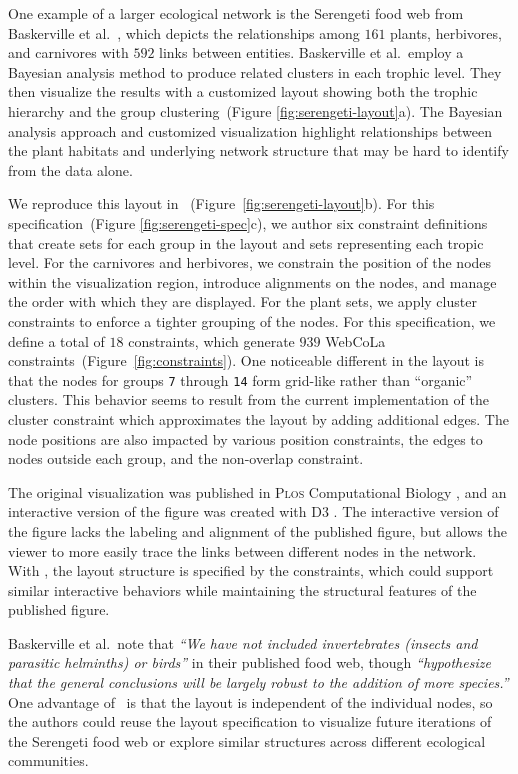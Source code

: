 One example of a larger ecological network is the Serengeti food web from
Baskerville et al.~\cite{baskerville2011spatial}, which depicts the
relationships among $161$ plants, herbivores, and carnivores with $592$ links
between entities. Baskerville et al.\ employ a Bayesian analysis method to
produce related clusters in each trophic level. They then visualize the results with a
customized layout showing both the trophic hierarchy and
the group clustering~(Figure \ref{fig:serengeti-layout}a). The Bayesian
analysis approach and customized visualization highlight relationships between
the plant habitats and underlying network structure that may be hard to identify
from the data alone.

We reproduce this layout in \projectname~(Figure~\ref{fig:serengeti-layout}b).
For this specification~(Figure \ref{fig:serengeti-spec}c), we author six constraint 
definitions that create sets for each group in the layout and sets 
representing each tropic level. For the carnivores and herbivores,
we constrain the position of the nodes within the visualization region,
introduce alignments on the nodes, and manage the order with which they
are displayed. For the plant sets, we apply cluster constraints
to enforce a tighter grouping of the nodes. For this specification,
we define a total of $18$ \projectname constraints, which generate $939$
WebCoLa constraints~(Figure~\ref{fig:constraints}). One noticeable different
in the \projectname layout is that the nodes for groups \texttt{7} through
\texttt{14} form grid-like rather than ``organic'' clusters. This behavior
seems to result from the current implementation of the cluster constraint
which approximates the layout by adding additional edges. The node
positions are also impacted by various position constraints, the edges to 
nodes outside each group, and the non-overlap constraint.

The original visualization was published in \textsc{Plos} Computational
Biology \cite{baskerville2011spatial}, and an interactive version of the
figure was created with D3 \cite{baskerville2011interactive}. The
interactive version of the figure lacks the labeling and alignment of the
published figure, but allows the viewer to more easily trace the links
between different nodes in the network. With \projectname, the layout
structure is specified by the constraints, which could support similar
interactive behaviors while maintaining the structural features of the
published figure.

Baskerville et al.\ note that \emph{``We have not included invertebrates
  (insects and parasitic helminths) or birds''} in their published food
web, though \emph{``hypothesize that the general conclusions will be
  largely robust to the addition of more species.''} One advantage of
\projectname~is that the layout is independent of the individual nodes, so
the authors could reuse the layout specification to visualize future iterations
of the Serengeti food web or explore similar structures across different
ecological communities.
